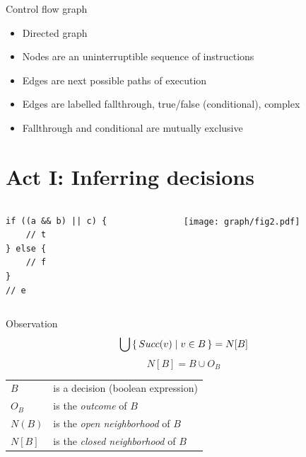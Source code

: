 \documentclass[xcolor = {dvipsnames, table}, aspectratio=169]{beamer}
\begin{document}
\begin{frame}
    \begin{block}{Control flow graph}
        \begin{itemize}
            \item Directed graph
            \item Nodes are an uninterruptible sequence of instructions
            \item Edges are next possible paths of execution
            \item Edges are labelled fallthrough, true/false (conditional), complex
            \item Fallthrough and conditional are mutually exclusive
        \end{itemize}
    \end{block}
\end{frame}

\section{Act I: Inferring decisions}
\begin{frame}[fragile]
    \begin{columns}
        \begin{column}{0.4\textwidth}
            \begin{lstlisting}[basicstyle = \footnotesize\ttfamily]
if ((a && b) || c) {
    // t
} else {
    // f
}
// e
            \end{lstlisting}
        \end{column}
        \begin{column}{0.4\textwidth}
            \texttt{[image: graph/fig2.pdf]}
        \end{column}
    \end{columns}
\end{frame}

\begin{frame}
    \begin{block}{Observation}
        \begin{equation*}
            \bigcup \set{Succ(v) \mid v \in B} = N[B]
        \end{equation*}
        \begin{equation*}
            N[B] = B \cup O_B
        \end{equation*}

        \begin{tabular}{l l}
            $B$    & is a decision (boolean expression) \\
            $O_B$  & is the \emph{outcome} of $B$ \\
            $N(B)$ & is the \emph{open neighborhood} of $B$ \\
            $N[B]$ & is the \emph{closed neighborhood} of $B$ \\
        \end{tabular}
    \end{block}
\end{frame}
\end{document}
